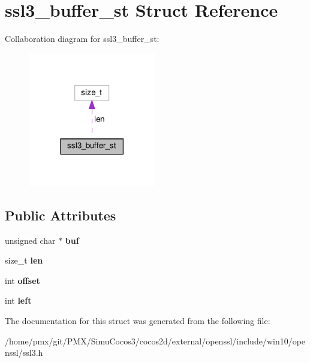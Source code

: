\hypertarget{structssl3__buffer__st}{}\section{ssl3\+\_\+buffer\+\_\+st Struct Reference}
\label{structssl3__buffer__st}


Collaboration diagram for ssl3\+\_\+buffer\+\_\+st\+:
\nopagebreak
\begin{figure}[H]
\begin{center}
\leavevmode
\includegraphics[width=158pt]{structssl3__buffer__st__coll__graph}
\end{center}
\end{figure}
\subsection*{Public Attributes}
\begin{DoxyCompactItemize}
\item 
\mbox{\label{structssl3__buffer__st_a7b769263d556c41433a8cb932dadd8f7}} 
unsigned char $\ast$ {\bfseries buf}
\item 
\mbox{\label{structssl3__buffer__st_adfe7ca1f516b5502e927d8731608085b}} 
size\+\_\+t {\bfseries len}
\item 
\mbox{\label{structssl3__buffer__st_a9102947618e368b7454b8f3a32f8bf09}} 
int {\bfseries offset}
\item 
\mbox{\label{structssl3__buffer__st_a5332410a4d9c20e73fd3dd36699436cb}} 
int {\bfseries left}
\end{DoxyCompactItemize}


The documentation for this struct was generated from the following file\+:\begin{DoxyCompactItemize}
\item 
/home/pmx/git/\+P\+M\+X/\+Simu\+Cocos3/cocos2d/external/openssl/include/win10/openssl/ssl3.\+h\end{DoxyCompactItemize}
